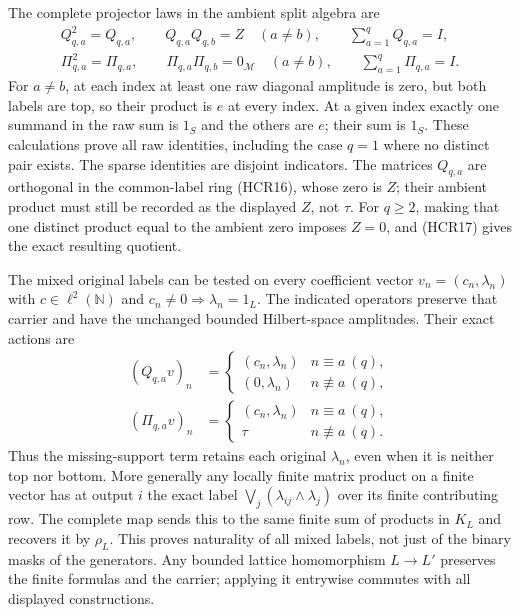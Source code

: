 The complete projector laws in the ambient split algebra are
\begin{equation}\tag{HCR20}
\begin{gathered}
 Q_{q,a}^2=Q_{q,a},\qquad
 Q_{q,a}Q_{q,b}=Z\quad(a\ne b),\qquad
 \sum_{a=1}^qQ_{q,a}=I,\\
 \Pi_{q,a}^2=\Pi_{q,a},\qquad
 \Pi_{q,a}\Pi_{q,b}=0_{\mathscr M}\quad(a\ne b),\qquad
 \sum_{a=1}^q\Pi_{q,a}=I.
\end{gathered}
\end{equation}
For $a\ne b$, at each index at least one raw diagonal
amplitude is zero, but both labels are top, so their
product is $e$ at every index. At a given index exactly
one summand in the raw sum is $1_S$ and the others are
$e$; their sum is $1_S$. These calculations prove all
raw identities, including the case $q=1$ where no distinct
pair exists. The sparse identities are disjoint indicators.
The matrices $Q_{q,a}$ are orthogonal in the common-label
ring (HCR16), whose zero is $Z$; their ambient product
must still be recorded as the displayed $Z$, not $\tau$.
For $q\ge2$, making that one distinct product equal to the
ambient zero imposes $Z=0$, and (HCR17) gives the exact
resulting quotient.

The mixed original labels can be tested on every coefficient
vector $v_n=(c_n,\lambda_n)$ with $c\in\ell^2(\mathbb N)$
and $c_n\ne0\Rightarrow\lambda_n=1_L$. The indicated
operators preserve that carrier and have the unchanged
bounded Hilbert-space amplitudes. Their exact actions are
\begin{equation}\tag{HCR21}
\begin{aligned}
 (Q_{q,a}v)_n&=
 \begin{cases}(c_n,\lambda_n)&n\equiv a\ (q),\\(0,\lambda_n)&n\not\equiv a\ (q),\end{cases}\\
 (\Pi_{q,a}v)_n&=
 \begin{cases}(c_n,\lambda_n)&n\equiv a\ (q),\\\tau&n\not\equiv a\ (q).
 \end{cases}
\end{aligned}
\end{equation}
Thus the missing-support term retains each original
$\lambda_n$, even when it is neither top nor bottom.
More generally any locally finite matrix product on a
finite vector has at output $i$ the exact label
$\bigvee_j(\lambda_{ij}\wedge\lambda_j)$ over its finite
contributing row. The complete map sends this to the
same finite sum of products in $K_L$ and recovers it
by $\rho_L$. This proves naturality of all mixed labels,
not just of the binary masks of the generators.
Any bounded lattice homomorphism $L\to L'$ preserves
the finite formulas and the carrier; applying it
entrywise commutes with all displayed constructions.


